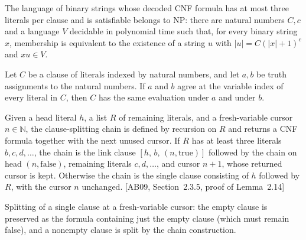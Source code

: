 \begin{theorem}
\label{Complexity.SAT3_mem_NP}
\leanok
{}
The language of binary strings whose decoded CNF formula has at most three literals per
clause and is satisfiable belongs to NP: there are natural numbers $C,c$ and a language
$V$ decidable in polynomial time such that, for every binary string $x$, membership is
equivalent to the existence of a string $u$ with $|u|=C(|x|+1)^c$ and $xu\in V$.
\end{theorem}
\begin{lemma}
\label{Complexity.satClause_congr}
\leanok
{}
Let $C$ be a clause of literals indexed by natural numbers, and let $a,b$ be truth
assignments to the natural numbers. If $a$ and $b$ agree at the variable index of every
literal in $C$, then $C$ has the same evaluation under $a$ and under $b$.
\end{lemma}

\begin{definition}
\label{Complexity.satChain}
\leanok
Given a head literal $h$, a list $R$ of remaining literals, and a fresh-variable
cursor $n \in \mathbb{N}$, the clause-splitting chain is defined by recursion on
$R$ and returns a CNF formula together with the next unused cursor. If $R$ has at
least three literals $b, c, d, \dots$, the chain is the link clause
$[h,\, b,\, (n,\mathrm{true})]$ followed by the chain on head
$(n,\mathrm{false})$, remaining literals $c, d, \dots$, and cursor $n + 1$, whose
returned cursor is kept. Otherwise the chain is the single clause consisting of
$h$ followed by $R$, with the cursor $n$ unchanged.
[AB09, Section~2.3.5, proof of Lemma~2.14]
\end{definition}

\begin{definition}
\label{Complexity.satSplitClause}
\leanok
{}
Splitting of a single clause at a fresh-variable cursor: the empty clause is
preserved as the formula containing just the empty clause (which must remain
false), and a nonempty clause is split by the chain construction.
\end{definition}

